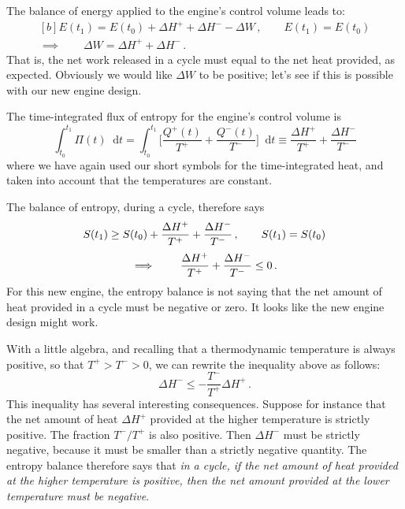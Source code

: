 \documentclass[a4paper,12pt,%
onecolumn,oneside,%
british%
]{memoir}
\newcommand*{\di}{\mathop{}\!\mathrm{d}}%
\newcommand*{\incr}{\Delta}%
\renewcommand*{\|}[1][]{\nonscript\:#1\vert\nonscript\:\mathopen{}}
\newcommand*{\yti}{t_{0}}
\newcommand*{\ytf}{t_{1}}
\newcommand*{\dt}{\di t}
\newcommand*{\yE}{E}
\newcommand*{\yQ}{Q}%
\newcommand*{\yQp}{\yQ^{+}}%
\newcommand*{\yQm}{\yQ^{-}}%
\newcommand*{\yhep}{\incr H^{+}}%
\newcommand*{\yhem}{\incr H^{-}}%
\newcommand*{\yW}{\incr W}%
\newcommand*{\yS}{S}
\newcommand*{\yB}{\varPi}
\newcommand*{\yT}{T}%
\newcommand*{\yTp}{\yT^{+}}%
\newcommand*{\yTm}{\yT^{-}}%
\begin{document}
The balance of energy applied to the engine's control volume leads to:
\begin{equation}\label{eq:engine2_heatwork}
  \begin{gathered}[b]
    \yE(\ytf) = \yE(\yti) + \yhep + \yhem - \yW \,,
    \qquad
    \yE(\ytf)=\yE(\yti)
    \\
    \implies\qquad
    \yW = \yhep + \yhem \,.
  \end{gathered}
\end{equation}
That is, the net work released in a cycle must equal to the net heat provided, as expected. Obviously we would like $\yW$ to be positive; let's see if this is possible with our new engine design.

\medskip

The time-integrated flux of entropy for the engine's control volume is
\begin{equation*}
    \int_{\yti}^{\ytf}\!\!\yB(t)\dt =
    \int_{\yti}^{\ytf}\!\biggl[\frac{\yQp(t)}{\yTp} +
    \frac{\yQm(t)}{\yTm}
    \biggr]\dt
\equiv \frac{\yhep}{\yTp} + \frac{\yhem}{\yTm}
\end{equation*}
where we have again used our short symbols for the time-integrated heat, and taken into account that the temperatures are constant.

The balance of entropy, during a cycle, therefore says
\begin{equation*}
  \begin{gathered}
    \yS(\ytf) \ge \yS(\yti) + \frac{\yhep}{\yTp} + \frac{\yhem}{\yTm}
    \,,
    \qquad
    \yS(\ytf)=\yS(\yti)
    \\[\jot]
    \implies\qquad
      \frac{\yhep}{\yTp} + \frac{\yhem}{\yTm}  \le 0 \,.
  \end{gathered}
\end{equation*}
For this new engine, the entropy balance is not saying that the net amount of heat provided in a cycle must be negative or zero. It looks like the new engine design might work.

\medskip

With a little algebra, and recalling that a thermodynamic temperature is always positive, so that $\yTp > \yTm > 0$, we can rewrite the inequality above as follows:
\begin{equation}\label{eq:engine2_heatminus}
  \yhem \le -\frac{\yTm}{\yTp}\yhep \,.
\end{equation}
This inequality has several interesting consequences. Suppose for instance that the net amount of heat $\yhep$ provided at the higher temperature is strictly positive.
The fraction $\yTm/\yTp$ is also positive. Then $\yhem$ must be strictly negative, because it must be smaller than a strictly negative quantity. The entropy balance therefore says that \emph{in a cycle, if the net amount of heat provided at the higher temperature is positive, then the net amount provided at the lower temperature must be negative}.
\end{document}
